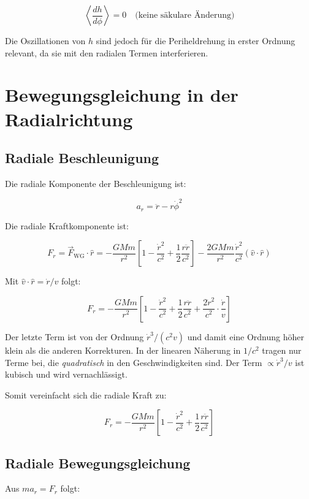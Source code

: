 \[
\left\langle \frac{dh}{d\phi} \right\rangle = 0 \quad \text{(keine säkulare Änderung)}
\]

Die Oszillationen von \( h \) sind jedoch für die Periheldrehung in erster Ordnung relevant, da sie mit den radialen Termen interferieren.

\section{Bewegungsgleichung in der Radialrichtung}
\label{app:periheldrehung_radial}

\subsection{Radiale Beschleunigung}
\label{sub:periheldrehung_beschleunigung}

Die radiale Komponente der Beschleunigung ist:

\[
a_r = \ddot{r} - r\dot{\phi}^2
\]

Die radiale Kraftkomponente ist:

\[
F_r = \vec{F}_{\text{WG}} \cdot \hat{r} = -\frac{GMm}{r^2} 
\left[ 1 - \frac{\dot{r}^2}{c^2} + \frac{1}{2} \frac{r\ddot{r}}{c^2} \right] 
-\frac{2GMm}{r^2} \frac{\dot{r}^2}{c^2} (\hat{v} \cdot \hat{r})
\]

Mit \( \hat{v} \cdot \hat{r} = \dot{r}/v \) folgt:

\[
F_r = -\frac{GMm}{r^2} \left[ 1 - \frac{\dot{r}^2}{c^2} + \frac{1}{2} \frac{r\ddot{r}}{c^2} 
+ \frac{2\dot{r}^2}{c^2} \cdot \frac{\dot{r}}{v} \right]
\]

Der letzte Term ist von der Ordnung \( \dot{r}^3/(c^2 v) \) und damit eine Ordnung höher klein als die anderen Korrekturen. In der linearen Näherung in \( 1/c^2 \) tragen nur Terme bei, die \emph{quadratisch} in den Geschwindigkeiten sind. Der Term \( \propto \dot{r}^3/v \) ist kubisch und wird vernachlässigt.

Somit vereinfacht sich die radiale Kraft zu:

\[
F_r = -\frac{GMm}{r^2} \left[ 1 - \frac{\dot{r}^2}{c^2} + \frac{1}{2} \frac{r\ddot{r}}{c^2} \right] \tag{H.2}
\]

\subsection{Radiale Bewegungsgleichung}
\label{sub:periheldrehung_radial_gleichung}

Aus \( m a_r = F_r \) folgt:

